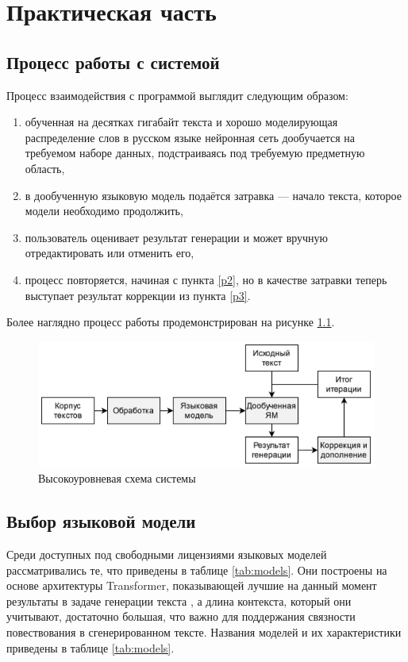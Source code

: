 \chapter{Практическая часть}

\section{Процесс работы с системой}

Процесс взаимодействия с программой выглядит следующим образом:
\begin{enumerate}
    \item обученная на десятках гигабайт текста и хорошо моделирующая распределение слов в русском языке нейронная сеть дообучается на требуемом наборе данных, подстраиваясь под требуемую предметную область,
    \item \label{p2} в дообученную языковую модель подаётся затравка --- начало текста, которое модели необходимо продолжить,
    \item \label{p3} пользователь оценивает результат генерации и может вручную отредактировать или отменить его,
    \item процесс повторяется, начиная с пункта \ref*{p2}, но в качестве затравки теперь выступает результат коррекции из пункта \ref*{p3}.
\end{enumerate}

Более наглядно процесс работы продемонстрирован на рисунке \ref*{fig:pipeline}.

\begin{figure}
    \centering
    \includegraphics[width=\textwidth]{../inc/images/pipeline.png}
    \caption{Высокоуровневая схема системы}
    \label{fig:pipeline}
\end{figure}

\section{Выбор языковой модели}

Среди доступных под свободными лицензиями языковых моделей рассматривались те, что приведены в таблице \ref*{tab:models}. Они построены на основе архитектуры Transformer, показывающей лучшие на данный момент результаты в задаче генерации текста \cite{art:models_review}, а длина контекста, который они учитывают, достаточно большая, что важно для поддержания связности повествования в сгенерированном тексте. Названия моделей и их характеристики приведены в таблице \ref*{tab:models}.

